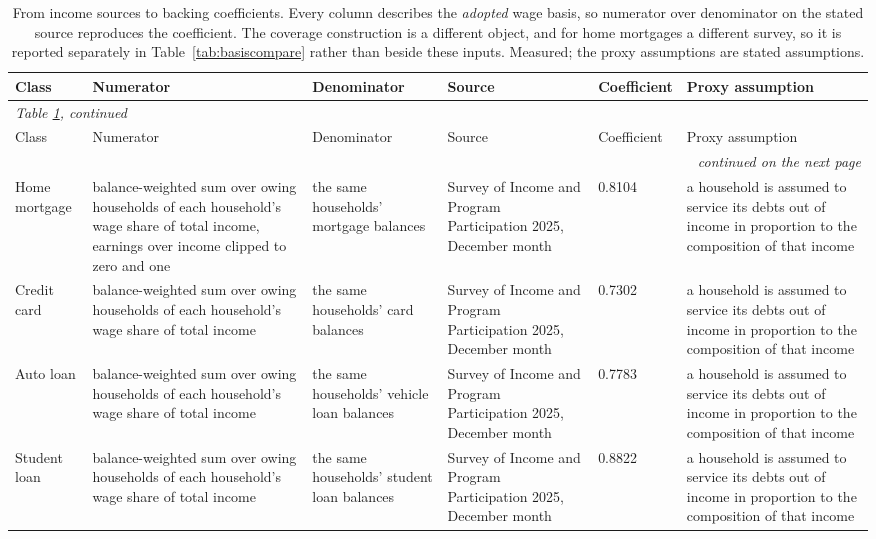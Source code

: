 \begin{longtable}{p{1.5cm}p{3.3cm}p{2.4cm}p{2.2cm}p{1.1cm}p{2.8cm}}
\caption{From income sources to backing coefficients. Every column describes the \emph{adopted} wage basis, so numerator over denominator on the stated source reproduces the coefficient. The coverage construction is a different object, and for home mortgages a different survey, so it is reported separately in Table~\ref{tab:basiscompare} rather than beside these inputs. Measured; the proxy assumptions are stated assumptions.}\label{tab:bridge}\\
\toprule
Class & Numerator & Denominator & Source & Coefficient & Proxy assumption \\
\midrule
\endfirsthead
\multicolumn{6}{l}{\itshape Table \ref{tab:bridge}, continued} \\
\toprule
Class & Numerator & Denominator & Source & Coefficient & Proxy assumption \\
\midrule
\endhead
\midrule \multicolumn{6}{r}{\itshape continued on the next page} \\
\endfoot
\bottomrule
\endlastfoot
Home mortgage & balance-weighted sum over owing households of each household's wage share of total income, earnings over income clipped to zero and one & the same households' mortgage balances & Survey of Income and Program Participation 2025, December month & 0.8104 & a household is assumed to service its debts out of income in proportion to the composition of that income \\
Credit card & balance-weighted sum over owing households of each household's wage share of total income & the same households' card balances & Survey of Income and Program Participation 2025, December month & 0.7302 & a household is assumed to service its debts out of income in proportion to the composition of that income \\
Auto loan & balance-weighted sum over owing households of each household's wage share of total income & the same households' vehicle loan balances & Survey of Income and Program Participation 2025, December month & 0.7783 & a household is assumed to service its debts out of income in proportion to the composition of that income \\
Student loan & balance-weighted sum over owing households of each household's wage share of total income & the same households' student loan balances & Survey of Income and Program Participation 2025, December month & 0.8822 & a household is assumed to service its debts out of income in proportion to the composition of that income \\

\end{longtable}
